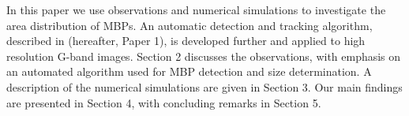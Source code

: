 \documentclass{emulateapj}
\begin{document}
In this paper we use observations and numerical simulations to investigate the area distribution of MBPs. An automatic detection and tracking algorithm, described in \cite{Croc09} (hereafter, Paper 1), is developed further and applied to high resolution G-band images. 
Section 2 discusses the observations, with emphasis on an automated algorithm used for MBP detection and size determination.  A description of the numerical simulations are given in Section 3. Our main findings are presented in Section 4, with concluding remarks in Section 5.
\end{document}
